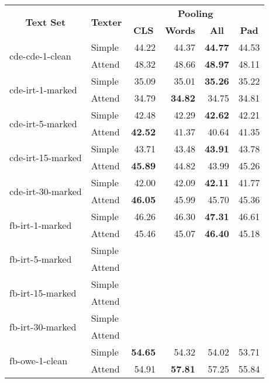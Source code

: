\begin{tabular}{| l | l | r | r | r | r |}
    \hline

    \multicolumn{1}{|c|}{\multirow{2}{*}{\textbf{Text Set}}} &
    \multicolumn{1}{|c|}{\multirow{2}{*}{\textbf{Texter}}} &
    \multicolumn{4}{|c|}{\textbf{Pooling}} \\

    &
    &
    \multicolumn{1}{|c|}{\textbf{CLS}} &
    \multicolumn{1}{|c|}{\textbf{Words}} &
    \multicolumn{1}{|c|}{\textbf{All}} &
    \multicolumn{1}{|c|}{\textbf{Pad}} \\

    \hline \hline

    \multirow{2}{*}{cde-cde-1-clean}
    & Simple & 44.22 & 44.37 & \textbf{44.77} & 44.53 \\
    & Attend & 48.32 & 48.66 & \textbf{48.97} & 48.11 \\ \hline

    \multirow{2}{*}{cde-irt-1-marked}
    & Simple & 35.09 & 35.01 & \textbf{35.26} & 35.22 \\
    & Attend & 34.79 & \textbf{34.82} & 34.75 & 34.81 \\ \hline

    \multirow{2}{*}{cde-irt-5-marked}
    & Simple & 42.48 & 42.29 & \textbf{42.62} & 42.21 \\
    & Attend & \textbf{42.52} & 41.37 & 40.64 & 41.35 \\ \hline

    \multirow{2}{*}{cde-irt-15-marked}
    & Simple & 43.71 & 43.48 & \textbf{43.91} & 43.78 \\
    & Attend & \textbf{45.89} & 44.82 & 43.99 & 45.26 \\ \hline

    \multirow{2}{*}{cde-irt-30-marked}
    & Simple & 42.00 & 42.09 & \textbf{42.11} & 41.77 \\
    & Attend & \textbf{46.05} & 45.99 & 45.70 & 45.36 \\ \hline \hline

    \multirow{2}{*}{fb-irt-1-marked}
    & Simple & 46.26 & 46.30 & \textbf{47.31} & 46.61 \\
    & Attend & 45.46 & 45.07 & \textbf{46.40} & 45.18 \\ \hline

    \multirow{2}{*}{fb-irt-5-marked}
    & Simple &  &  &  &  \\
    & Attend &  &  &  &  \\ \hline

    \multirow{2}{*}{fb-irt-15-marked}
    & Simple &  &  &  &  \\
    & Attend &  &  &  &  \\ \hline

    \multirow{2}{*}{fb-irt-30-marked}
    & Simple &  &  &  &  \\
    & Attend &  &  &  &  \\ \hline

    \multirow{2}{*}{fb-owe-1-clean}
    & Simple & \textbf{54.65} & 54.32 & 54.02 & 53.71 \\
    & Attend & 54.91 & \textbf{57.81} & 57.25 & 55.84 \\ \hline

\end{tabular}

